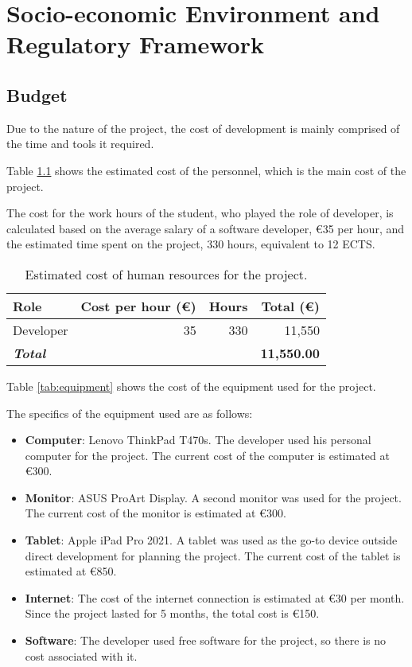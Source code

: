 \chapter{Socio-economic Environment and Regulatory Framework}\label{chap:planning}

\section{Budget}\label{sec:budget}

Due to the nature of the project, the cost of development is mainly comprised of the time and tools it required. 

Table \ref{tab:human-resources} shows the estimated cost of the personnel, which is the main cost of the project.

The cost for the work hours of the student, who played the role of developer, is calculated based on the average salary of a software developer, €35 per hour, and the estimated time spent on the project, 330 hours, equivalent to 12 ECTS.

\begin{table}[H]
    \begin{tabular}{l r r r}
        \hline
        \textbf{Role} & \textbf{Cost per hour (€)} & \textbf{Hours} & \textbf{Total (€)} \\
        \hline
        Developer & 35 & 330 & 11,550 \\
        \hline
        \textbf{\textit{Total}} & & & \textbf{11,550.00} \\
        \hline
    \end{tabular}
    \caption{Estimated cost of human resources for the project.}
    \label{tab:human-resources}
\end{table}

Table \ref{tab:equipment} shows the cost of the equipment used for the project.

The specifics of the equipment used are as follows:

\begin{itemize}
    \item \textbf{Computer}: Lenovo ThinkPad T470s. The developer used his personal computer for the project. The current cost of the computer is estimated at €300.
    \item \textbf{Monitor}: ASUS ProArt Display. A second monitor was used for the project. The current cost of the monitor is estimated at €300.
    \item \textbf{Tablet}: Apple iPad Pro 2021. A tablet was used as the go-to device outside direct development for planning the project. The current cost of the tablet is estimated at €850.
    \item \textbf{Internet}: The cost of the internet connection is estimated at €30 per month. Since the project lasted for 5 months, the total cost is €150.
    \item \textbf{Software}: The developer used free software for the project, so there is no cost associated with it.
\end{itemize}

